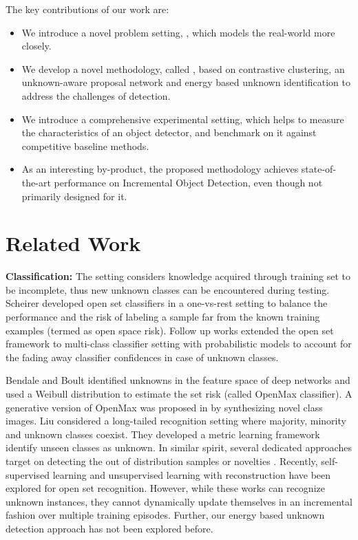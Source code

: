 \documentclass[final]{cvpr}
\begin{document}
\noindent The key contributions of our work are:
\begin{itemize}[leftmargin=*,topsep=0pt, noitemsep]
    \item We introduce a novel problem setting, \OWOD, which models the real-world more closely.
    \item We develop a novel methodology, called \method, based on contrastive clustering, an unknown-aware proposal network and energy based unknown identification to address the challenges of \ow detection.
    \item We introduce a comprehensive experimental setting, which helps to measure the \ow characteristics of an object detector, and benchmark \method on it against competitive baseline methods.
    \item As an interesting by-product, the proposed methodology achieves state-of-the-art performance on Incremental Object Detection, even though not primarily designed for it. 
\end{itemize}

\section{Related Work}\label{sec:related_works}
\noindent\textbf{\OS Classification:} The \os setting considers knowledge acquired through training set to be incomplete, thus new unknown classes can be encountered during testing.
Scheirer \etal \cite{scheirer2013toward}  developed open set classifiers in a one-vs-rest setting to balance the performance and the risk of labeling a sample far from the known training examples (termed as open space risk). Follow up works \cite{jain2014multi, scheirer2014probability} extended the open set framework to multi-class classifier setting with probabilistic models to account for the fading away classifier confidences in case of unknown classes.

Bendale and Boult \cite{bendale2016towards} identified unknowns in the feature space of deep networks and used a Weibull distribution to estimate the set risk (called OpenMax classifier).  A generative version of OpenMax was proposed in \cite{ge2017generative} by synthesizing novel class images. Liu \etal \cite{liu2019large} considered a long-tailed recognition setting where majority, minority and unknown classes coexist. They developed a metric learning framework identify unseen classes as unknown. In similar spirit, several dedicated approaches target on detecting the out of distribution samples \cite{liang2018enhancing} or novelties \cite{pidhorskyi2018generative}. Recently, self-supervised learning \cite{Perera_2020_CVPR} and unsupervised learning with reconstruction \cite{Yoshihashi_2019_CVPR} have been explored for open set recognition. However, while these works can recognize unknown instances, they cannot dynamically update themselves in an incremental fashion over multiple training episodes.  Further, our energy based unknown detection approach has not been explored before.
\end{document}
